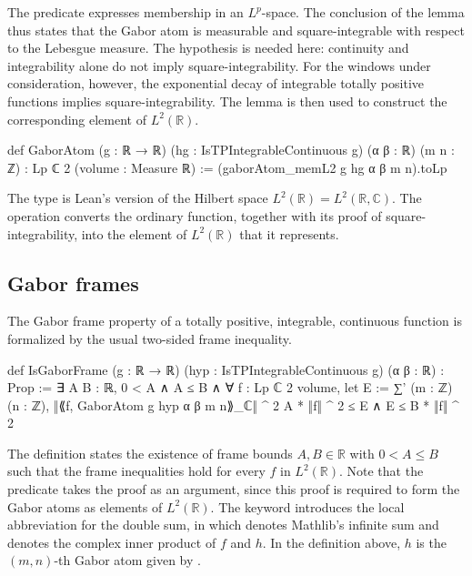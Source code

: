 \documentclass[reqno,a4paper,12pt]{amsart}
\numberwithin{equation}{section}
\def\R{{\mathbb R}}
\newcommand\1{\mathds{1}}
\begin{document}
The predicate  expresses membership in an $L^p$-space. The conclusion of the lemma thus states that the Gabor atom is measurable and square-integrable with respect to the Lebesgue measure. The hypothesis  is needed here: continuity and integrability alone do not imply square-integrability. For the windows under consideration, however, the exponential decay of integrable totally positive functions implies square-integrability. The lemma is then used to construct the corresponding element of $L^2(\mathbb{R})$.

\begin{leancode}
def GaborAtom
    (g : ℝ → ℝ) (hg : IsTPIntegrableContinuous g)
    (α β : ℝ) (m n : ℤ) :
    Lp ℂ 2 (volume : Measure ℝ) :=
    (gaborAtom_memL2 g hg α β m n).toLp
\end{leancode}

The type  is Lean's version of the Hilbert space $L^2(\R) = L^2(\mathbb{R},\mathbb{C})$. The operation  converts the ordinary
function, together with its proof of square-integrability, into the element of $L^2(\R)$ that it represents.

\subsection{Gabor frames}

The Gabor frame property of a totally positive, integrable, continuous function is formalized by the usual two-sided frame inequality.

\begin{leancode}
def IsGaborFrame
    (g : ℝ → ℝ) (hyp : IsTPIntegrableContinuous g)
    (α β : ℝ) : Prop :=
    ∃ A B : ℝ, 0 < A ∧ A ≤ B ∧ ∀ f : Lp ℂ 2 volume,
    let E :=
      ∑' (m : ℤ) (n : ℤ),
        ‖⟪f, GaborAtom g hyp α β m n⟫_ℂ‖ ^ 2
    A * ‖f‖ ^ 2 ≤ E ∧ E ≤ B * ‖f‖ ^ 2
\end{leancode}

The definition states the existence of frame bounds $A,B \in \R$ with $0 < A \leq B$ such that the frame inequalities hold for every $f$ in $L^2(\mathbb{R})$. Note that the predicate takes the proof  as an argument, since this proof is required to form the Gabor atoms as elements of $L^2(\mathbb{R})$. The keyword  introduces the local abbreviation  for the double sum, in which  denotes Mathlib's infinite sum and  denotes
the complex inner product of $f$ and $h$. In the definition above, $h$ is
the $(m,n)$-th Gabor atom given by .
\end{document}
